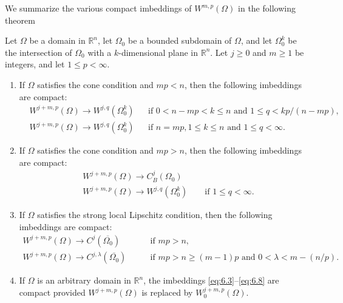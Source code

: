 We summarize the various compact imbeddings of $W^{m,p}(\Omega)$ in the following theorem

\begin{theorem}
  Let $\Omega$ be a domain in $\mathbb{R}^n$, let $\Omega_0$ be a bounded subdomain of $\Omega$, and let
  $\Omega_0^k$ be the intersection of $\Omega_0$ with a $k$-dimensional plane in $\mathbb{R}^n$.
  Let $j\geq 0$ and $m\geq 1$ be integers, and let $1\leq p<\infty$.
  \begin{enumerate}[label = \textbf{PART \Roman*},
                    labelindent = 0pt,
                    labelsep = 5pt,
                    leftmargin = 0pt,
                    labelwidth = 3em,
                    itemindent = *,
                    align = left]
    \item If $\Omega$ satisfies the cone condition and $mp<n$, then the following imbeddings are compact:
      \begin{align}
        & W^{j+m,p}(\Omega) \to W^{j,q}(\Omega_0^k) & & \text{if } 0 < n-mp < k \leq n \text{ and } 
          1\leq q < kp/(n-mp), \label{eq:6.3} \\
        & W^{j+m,p}(\Omega) \to W^{j,q}(\Omega_0^k) & & \text{if } n = mp, 1\leq k \leq n \text{ and }
          1\leq q <\infty. \label{eq:6.4}
      \end{align}
    \item If $\Omega$ satisfies the cone condition and $mp > n$, then the following imbeddings are compact:
      \begin{align}
        & W^{j+m,p}(\Omega) \to C_B^j(\Omega_0) \label{eq:6.5} \\
        & W^{j+m,p}(\Omega) \to W^{j,q}(\Omega_0^k) \qquad \text{if } 1\leq q < \infty. \label{eq:6.6}
      \end{align}
    \item If $\Omega$ satisfies the strong local Lipschitz condition, then the following imbeddings are compact:
      \begin{align}
        W^{j+m,p}(\Omega) \to C^j(\overline{\Omega_0}) \qquad & \text{if } mp > n, \label{eq:6.7} \\
        W^{j+m,p}(\Omega) \to C^{j,\lambda}(\overline{\Omega_0}) \qquad & \text{if } mp > n \geq (m-1)p
          \text{ and } 0 < \lambda < m - (n/p). \label{eq:6.8}
      \end{align}
    \item If $\Omega$ is an arbitrary domain in $\mathbb{R}^n$, the imbeddings \eqref{eq:6.3}--\eqref{eq:6.8}
      are compact provided $W^{j+m,p}(\Omega)$ is replaced by $W^{j+m,p}_0(\Omega)$.
  \end{enumerate}
\end{theorem}


